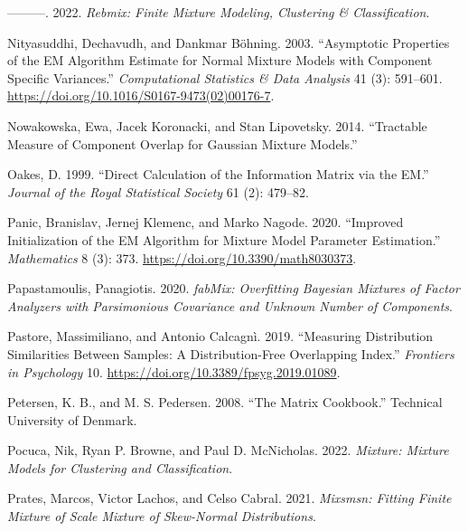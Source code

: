 \begin{CSLReferences}{1}{0}
\leavevmode{}%
---------. 2022. \emph{Rebmix: Finite Mixture Modeling, Clustering \& Classification}.

\leavevmode{}%
Nityasuddhi, Dechavudh, and Dankmar Böhning. 2003. {``Asymptotic Properties of the {EM} Algorithm Estimate for Normal Mixture Models with Component Specific Variances.''} \emph{Computational Statistics \& Data Analysis} 41 (3): 591--601. \url{https://doi.org/10.1016/S0167-9473(02)00176-7}.

\leavevmode{}%
Nowakowska, Ewa, Jacek Koronacki, and Stan Lipovetsky. 2014. {``Tractable {Measure} of {Component Overlap} for {Gaussian Mixture Models}.''}

\leavevmode{}%
Oakes, D. 1999. {``Direct Calculation of the Information Matrix via the {EM}.''} \emph{Journal of the Royal Statistical Society} 61 (2): 479--82.

\leavevmode{}%
Panic, Branislav, Jernej Klemenc, and Marko Nagode. 2020. {``Improved Initialization of the EM Algorithm for Mixture Model Parameter Estimation.''} \emph{Mathematics} 8 (3): 373. \url{https://doi.org/10.3390/math8030373}.

\leavevmode{}%
Papastamoulis, Panagiotis. 2020. \emph{fabMix: Overfitting Bayesian Mixtures of Factor Analyzers with Parsimonious Covariance and Unknown Number of Components}.

\leavevmode{}%
Pastore, Massimiliano, and Antonio Calcagnì. 2019. {``Measuring {Distribution Similarities Between Samples}: {A Distribution-Free Overlapping Index}.''} \emph{Frontiers in Psychology} 10. \url{https://doi.org/10.3389/fpsyg.2019.01089}.

\leavevmode{}%
Petersen, K. B., and M. S. Pedersen. 2008. {``The Matrix Cookbook.''} Technical University of Denmark.

\leavevmode{}%
Pocuca, Nik, Ryan P. Browne, and Paul D. McNicholas. 2022. \emph{Mixture: Mixture Models for Clustering and Classification}.

\leavevmode{}%
Prates, Marcos, Victor Lachos, and Celso Cabral. 2021. \emph{Mixsmsn: Fitting Finite Mixture of Scale Mixture of Skew-Normal Distributions}.


\end{CSLReferences}

